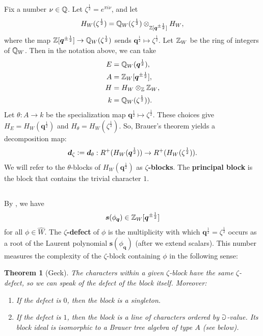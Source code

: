 \documentclass[a4paper,10pt,leqno]{amsart}
\theoremstyle{plain}
\theoremstyle{plain}
\newtheorem{thm}{Theorem}[subsection]
\theoremstyle{plain}
\theoremstyle{definition}
\theoremstyle{remark}
\newcommand{\dfemph}[1]{\textbf{#1}}
\newcommand{\Q}{\bm{q}}
\newcommand{\slope}{\nu}
\begin{document}
Fix a number $\slope \in \bb{Q}$.
Let $\zeta^{\frac{1}{2}} = e^{\pi i\slope}$, and let
\begin{align}
H_W(\zeta^{\frac{1}{2}}) = \bb{Q}_W(\zeta^{\frac{1}{2}}) \otimes_{\bb{Z}[\Q^{\pm\frac{1}{2}}]} H_W,
\end{align}
where the map $\bb{Z}[\Q^{\pm\frac{1}{2}}] \to \bb{Q}_W(\zeta^{\frac{1}{2}})$ sends $\Q^{\frac{1}{2}} \mapsto \zeta^{\frac{1}{2}}$.
Let $\mathbb{Z}_W$ be the ring of integers of $\mathbb{Q}_W$. 
Then in the notation above, we can take
\begin{align}
E &= \bb{Q}_W(\Q^{\frac{1}{2}}),\\
A &= \bb{Z}_W[\Q^{\pm\frac{1}{2}}],\\
H &= H_W \otimes_{\bb{Z}} \bb{Z}_W,\\
k &= \bb{Q}_W(\zeta^{\frac{1}{2}})).
\end{align}
Let $\theta : A \to k$ be the specialization map $\Q^{\frac{1}{2}} \mapsto \zeta^{\frac{1}{2}}$.
These choices give $H_E = H_W(\Q^{\frac{1}{2}})$ and $H_\theta = H_W(\zeta^{\frac{1}{2}})$.
So, Brauer's theorem yields a decomposition map:
\begin{align}
\bm{d}_\zeta \vcentcolon= \bm{d}_\theta : R^+(H_W(\Q^{\frac{1}{2}})) \to R^+(H_W(\zeta^{\frac{1}{2}})).
\end{align}
We will refer to the $\theta$-blocks of $H_W(\Q^{\frac{1}{2}})$ as \dfemph{$\zeta$-blocks}.
The \dfemph{principal block} is the block that contains the trivial character $1$.

\subsection{}

By \cite[Prop.\ 7.3.9]{gp}, we have 
\begin{align}
\bm{s}(\phi_{\Q}) \in \bb{Z}_W[\Q^{\pm\frac{1}{2}}]
\end{align}
for all $\phi \in \hat{W}$.
The \dfemph{$\zeta$-defect} of $\phi$ is the multiplicity with which $\Q^{\frac{1}{2}} = \zeta^{\frac{1}{2}}$ occurs as a root of the Laurent polynomial $\bm{s}(\phi_{\Q})$ (after we extend scalars).
This number measures the complexity of the $\zeta$-block containing $\phi$ in the following sense:

\begin{thm}[Geck]\label{thm:geck}
The characters within a given $\zeta$-block have the same $\zeta$-defect, so we can speak of the defect of the block itself.
Moreover:
\begin{enumerate}
\item 	If the defect is $0$, then the block is a singleton.
\item 	If the defect is $1$, then the block is a line of characters ordered by $\mathbb{a}$-value.
		Its block ideal is isomorphic to a Brauer tree algebra of type $A$ (see below).
\end{enumerate}
\end{thm}
\end{document}
